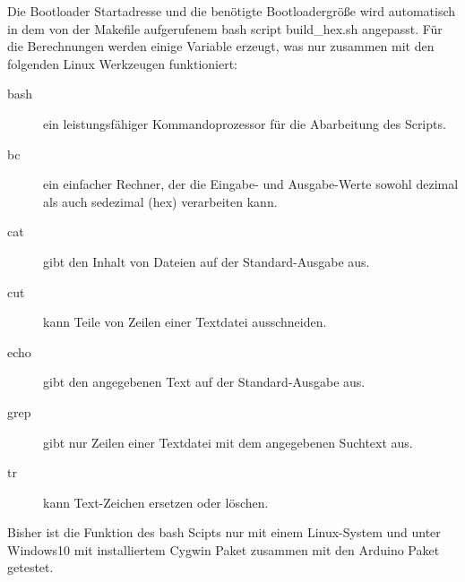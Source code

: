 Die Bootloader Startadresse und die benötigte Bootloadergröße wird
automatisch in dem von der Makefile aufgerufenem bash script build\_hex.sh angepasst.
Für die Berechnungen werden einige Variable erzeugt, was nur zusammen
mit den folgenden Linux Werkzeugen funktioniert:

\begin{description}
\item [bash] ein leistungsfähiger Kommandoprozessor für die Abarbeitung des Scripts. 
\item [bc] ein einfacher Rechner, der die Eingabe- und Ausgabe-Werte
sowohl dezimal als auch sedezimal (hex) verarbeiten kann.
\item [cat] gibt den Inhalt von Dateien auf der Standard-Ausgabe aus.
\item [cut] kann Teile von Zeilen einer Textdatei ausschneiden.
\item [echo] gibt den angegebenen Text auf der Standard-Ausgabe aus.
\item [grep] gibt nur Zeilen einer Textdatei mit dem angegebenen Suchtext aus.
\item [tr] kann Text-Zeichen ersetzen oder löschen.
\end{description}

Bisher ist die Funktion des bash Scipts nur mit einem Linux-System und
unter Windows10 mit installiertem Cygwin Paket zusammen mit den Arduino Paket getestet.

